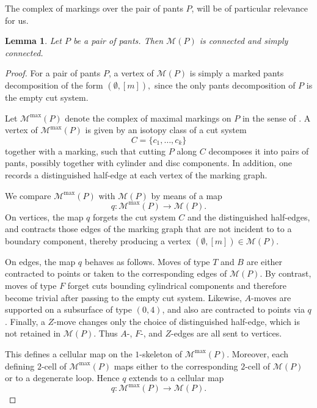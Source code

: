 \documentclass{amsart}
\newtheorem{lemma}[theorem]{Lemma}%
\theoremstyle{definition}
\numberwithin{equation}{section}
\begin{document}
\medskip

The complex of markings over the pair of pants $P$, will be of particular relevance for us.

\begin{lemma}\label{lemma: marked complex for pants is simply connected}
Let $P$ be a pair of pants. Then $\mathcal{M}(P)$ is connected and simply connected.
\end{lemma}


\begin{proof}
For a pair of pants $P$, a vertex of $\mathcal M(P)$ is simply a marked pants decomposition of the form $(\emptyset,[m]),$ since the only pants decomposition of $P$ is the empty cut system.

Let $\mathcal M^{\max}(P)$ denote the complex of maximal markings on $P$ in the sense of \cite[Section~5]{bk_marked_surfaces}. A vertex of $\mathcal M^{\max}(P)$ is given by an isotopy class of a cut system
\[
C=\{c_1,\ldots,c_k\}
\]
together with a marking, such that cutting $P$ along $C$ decomposes it into pairs of pants, possibly together with cylinder and disc components. In addition, one records a distinguished half-edge at each vertex of the marking graph.

We compare $\mathcal M^{\max}(P)$ with $\mathcal M(P)$ by means of a map
\[
q:\mathcal M^{\max}(P)\longrightarrow \mathcal M(P).
\]
On vertices, the map $q$ forgets the cut system $C$ and the distinguished half-edges, and contracts those edges of the marking graph that are not incident to to a boundary component, thereby producing a vertex $(\emptyset,[m])\in \mathcal{M}(P)$.

On edges, the map $q$ behaves as follows. Moves of type $T$ and $B$ are either contracted to points or taken to the corresponding edges of $\mathcal M(P)$. By contrast, moves of type $F$ forget cuts bounding cylindrical components and therefore become trivial after passing to the empty cut system. Likewise, $A$-moves are supported on a subsurface of type $(0,4)$, and also are contracted to points via $q$. Finally, a $Z$-move changes only the choice of distinguished half-edge, which is not retained in $\mathcal M(P)$. Thus $A$-, $F$-, and $Z$-edges are all sent to vertices.


This defines a cellular map on the $1$-skeleton of $\mathcal M^{\max}(P)$. Moreover, each defining $2$-cell of $\mathcal M^{\max}(P)$ maps either to the corresponding $2$-cell of $\mathcal M(P)$ or to a degenerate loop. Hence $q$ extends to a cellular map
\[
q:\mathcal M^{\max}(P)\to \mathcal M(P).
\]



\end{proof}
\end{document}
